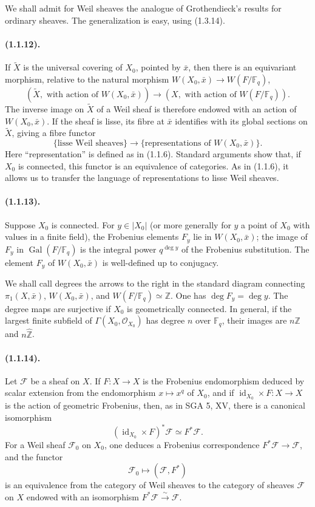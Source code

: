 \documentclass[11pt]{article}
\theoremstyle{remark}
\newcommand{\Fq}{\mathbb{F}_q}
\newcommand{\Gal}{\operatorname{Gal}}
\begin{document}
We shall admit for Weil sheaves the analogue of Grothendieck's results for ordinary sheaves. The generalization is easy, using (1.3.14).

\paragraph{(1.1.12).} If $\widetilde X$ is the universal covering of $X_0$, pointed by $\bar x$, then there is an equivariant morphism, relative to the natural morphism $W(X_0,\bar x)\to W(F/\Fq)$,
\[
(\widetilde X,\text{ with action of }W(X_0,\bar x))
\longrightarrow
(X,\text{ with action of }W(F/\Fq)).
\]
The inverse image on $\widetilde X$ of a Weil sheaf is therefore endowed with an action of $W(X_0,\bar x)$. If the sheaf is lisse, its fibre at $\bar x$ identifies with its global sections on $\widetilde X$, giving a fibre functor
\[
\{\text{lisse Weil sheaves}\}\longrightarrow\{ \text{representations of }W(X_0,\bar x)
\}.
\]
Here ``representation'' is defined as in (1.1.6). Standard arguments show that, if $X_0$ is connected, this functor is an equivalence of categories. As in (1.1.6), it allows us to transfer the language of representations to lisse Weil sheaves.

\paragraph{(1.1.13).} Suppose $X_0$ is connected. For $y\in |X_0|$ (or more generally for $y$ a point of $X_0$ with values in a finite field), the Frobenius elements $F_y$ lie in $W(X_0,\bar x)$; the image of $F_y$ in $\Gal(F/\Fq)$ is the integral power $q^{\deg y}$ of the Frobenius substitution. The element $F_y$ of $W(X_0,\bar x)$ is well-defined up to conjugacy.

We shall call degrees the arrows to the right in the standard diagram connecting $\pi_1(X,\bar x)$, $W(X_0,\bar x)$, and $W(F/\Fq)\simeq\mathbb Z$. One has $\deg F_y=\deg y$. The degree maps are surjective if $X_0$ is geometrically connected. In general, if the largest finite subfield of $\Gamma(X_0,\mathcal O_{X_0})$ has degree $n$ over $\Fq$, their images are $n\mathbb Z$ and $n\widehat{\mathbb Z}$.

\paragraph{(1.1.14).} Let $\mathcal F$ be a sheaf on $X$. If $F:X\to X$ is the Frobenius endomorphism deduced by scalar extension from the endomorphism $x\mapsto x^q$ of $X_0$, and if $\operatorname{id}_{X_0}\times F:X\to X$ is the action of geometric Frobenius, then, as in SGA 5, XV, there is a canonical isomorphism
\[
(\operatorname{id}_{X_0}\times F)^*\mathcal F\simeq F^*\mathcal F.
\]
For a Weil sheaf $\mathcal F_0$ on $X_0$, one deduces a Frobenius correspondence $F^*\mathcal F\to\mathcal F$, and the functor
\[
\mathcal F_0\longmapsto (\mathcal F,F^*)
\]
is an equivalence from the category of Weil sheaves to the category of sheaves $\mathcal F$ on $X$ endowed with an isomorphism $F^*\mathcal F\xrightarrow{\sim}\mathcal F$.
\end{document}
